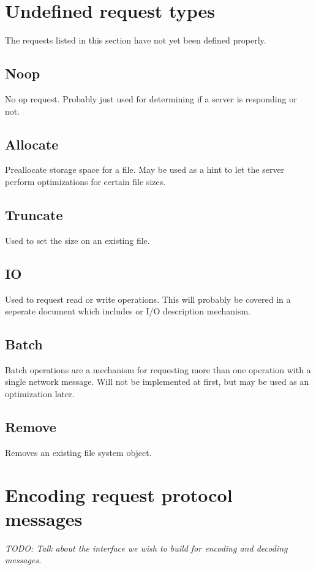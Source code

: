 \documentclass[11pt, letterpaper]{article} %
\begin{document}
\section{Undefined request types}

The requests listed in this section have not yet been defined properly.

\subsection{Noop}

No op request.  Probably just used for determining if a server is
responding or not.

\subsection{Allocate}

Preallocate storage space for a file.  May be used as a hint to let the
server perform optimizations for certain file sizes.

\subsection{Truncate}

Used to set the size on an existing file.

\subsection{IO}

Used to request read or write operations.  This will probably be covered
in a seperate document which includes or I/O description mechanism.

\subsection{Batch}

Batch operations are a mechanism for requesting more than one operation
with a single network message.  Will not be implemented at first, but
may be used as an optimization later.

\subsection{Remove}

Removes an existing file system object.

\section{Encoding request protocol messages}

\emph{TODO: Talk about the interface we wish to build for encoding
and decoding messages.}
\end{document}
